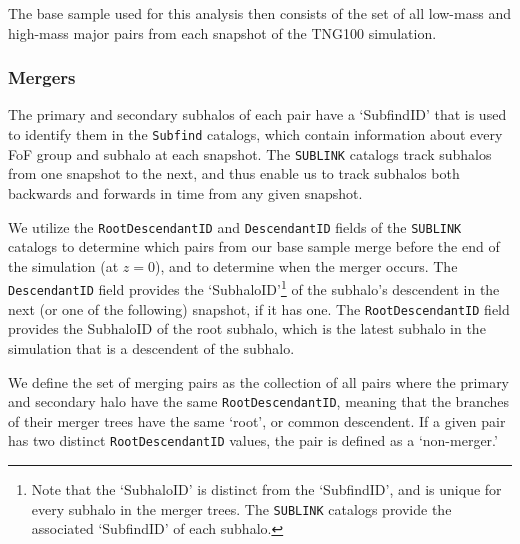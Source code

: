\documentclass[twocolumn]{aastex631}
\newcommand{\rsep}{\ensuremath{\rm r_{sep}}}
\begin{document}

The base sample used for this analysis then consists of the set of all low-mass and high-mass major pairs from each snapshot of the TNG100 simulation. 


\subsubsection{Mergers}

The primary and secondary subhalos of each pair have a `SubfindID' that is used to identify them in the \texttt{Subfind} catalogs, which contain information about every FoF group and subhalo at each snapshot. 
The \texttt{SUBLINK} catalogs track subhalos from one snapshot to the next, and thus enable us to track subhalos both backwards and forwards in time from any given snapshot. 

We utilize the \texttt{RootDescendantID} and \texttt{DescendantID} fields of the \texttt{SUBLINK} catalogs to determine which pairs from our base sample merge before the end of the simulation (at $z=0$), and to determine when the merger occurs. 
The \texttt{DescendantID} field provides the `SubhaloID'\footnote{Note that the `SubhaloID' is distinct from the `SubfindID', and is unique for every subhalo in the merger trees. 
The \texttt{SUBLINK} catalogs provide the associated `SubfindID' of each subhalo.} of the subhalo's descendent in the next (or one of the following) snapshot, if it has one. 
The \texttt{RootDescendantID} field provides the SubhaloID of the root subhalo, which is the latest subhalo in the simulation that is a descendent of the subhalo.  

We define the set of merging pairs as the collection of all pairs where the primary and secondary halo have the same \texttt{RootDescendantID}, meaning that the branches of their merger trees have the same `root', or common descendent. 
If a given pair has two distinct \texttt{RootDescendantID} values, the pair is defined as a `non-merger.'
\end{document}

